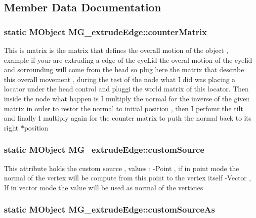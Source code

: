 \subsection{Member Data Documentation}
\hypertarget{class_m_g__extrude_edge_a1909e4adf43d003b24afb361c17d5b12}{
\subsubsection[{counter\-Matrix}]{\setlength{\rightskip}{0pt plus 5cm}static M\-Object M\-G\-\_\-extrude\-Edge\-::counter\-Matrix\hspace{0.3cm}{\ttfamily [static]}}}\label{class_m_g__extrude_edge_a1909e4adf43d003b24afb361c17d5b12}
This is matrix is the matrix that defines the overall motion of the object , example if your are extruding a edge of the eye\-Lid the overal motion of the eyelid and sorrounding will come from the head so plug here the matrix that describe this overall movement , during the test of the node what I did was placing a locator under the head control and pluggi the world matrix of this locator. Then inside the node what happen is I multiply the normal for the inverse of the given matrix in order to restor the normal to initial position , then I perfomr the tilt and finally I multiply again for the counter matrix to puth the normal back to its right $\ast$position \hypertarget{class_m_g__extrude_edge_a810bf474f970d9b05f55a5224341cf51}{
\subsubsection[{custom\-Source}]{\setlength{\rightskip}{0pt plus 5cm}static M\-Object M\-G\-\_\-extrude\-Edge\-::custom\-Source\hspace{0.3cm}{\ttfamily [static]}}}\label{class_m_g__extrude_edge_a810bf474f970d9b05f55a5224341cf51}
This attribute holds the custom source , values \-: -\/\-Point , if in point mode the normal of the vertex will be compute from this point to the vertex itself -\/\-Vector , If in vector mode the value will be used as normal of the verticies \hypertarget{class_m_g__extrude_edge_a665694b78faf733a4ae0058cd9ecd6be}{
\subsubsection[{custom\-Source\-As}]{\setlength{\rightskip}{0pt plus 5cm}static M\-Object M\-G\-\_\-extrude\-Edge\-::custom\-Source\-As\hspace{0.3cm}{\ttfamily [static]}}}\label{class_m_g__extrude_edge_a665694b78faf733a4ae0058cd9ecd6be}
